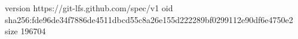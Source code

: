 version https://git-lfs.github.com/spec/v1
oid sha256:fde96de34f7886de4511dbcd55c8a26e155d222289bf0299112e90df6e4750e2
size 196704

